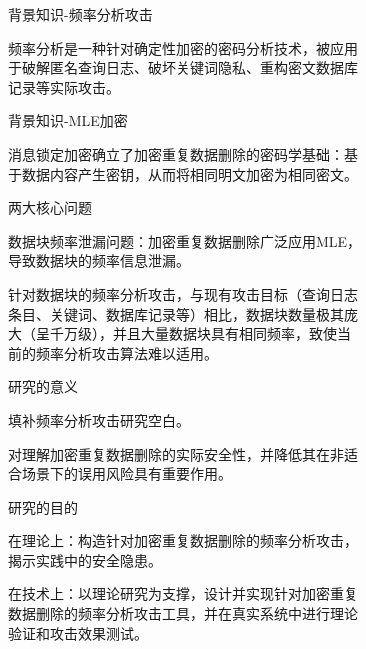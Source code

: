 \documentclass[aspectratio=43]{beamer}
\begin{document}
\begin{frame}{背景知识-频率分析攻击}
\begin{card}
频率分析是一种针对确定性加密的密码分析技术，被应用\\[2mm]于破解匿名查询日志、破坏关键词隐私、重构密文数据库\\[2mm]记录等实际攻击。
\end{card}   
\end{frame}

\begin{frame}{背景知识-MLE加密}
\begin{card}
消息锁定加密确立了加密重复数据删除的密码学基础：基\\[2mm]于数据内容产生密钥，从而将相同明文加密为相同密文。
\end{card}   
\end{frame}

\begin{frame}{两大核心问题}
\begin{card}
数据块频率泄漏问题：加密重复数据删除广泛应用MLE，\\[2mm]导致数据块的频率信息泄漏。
\end{card}
\begin{card}
针对数据块的频率分析攻击，与现有攻击目标（查询日志\\[2mm]条目、关键词、数据库记录等）相比，数据块数量极其庞\\[2mm]大（呈千万级），并且大量数据块具有相同频率，致使当\\[2mm]前的频率分析攻击算法难以适用。
\end{card}
\end{frame}

\begin{frame}{研究的意义}
\begin{card}
填补频率分析攻击研究空白。
\end{card}
\begin{card}
对理解加密重复数据删除的实际安全性，并降低其在非适\\[2mm]合场景下的误用风险具有重要作用。
\end{card}
\end{frame}


\begin{frame}{研究的目的}
\begin{card}
在理论上：构造针对加密重复数据删除的频率分析攻击，\\[2mm]揭示实践中的安全隐患。
\end{card}
\begin{card}
在技术上：以理论研究为支撑，设计并实现针对加密重复\\[2mm]数据删除的频率分析攻击工具，并在真实系统中进行理论\\[2mm]验证和攻击效果测试。 
\end{card}
\end{frame}
\end{document}

